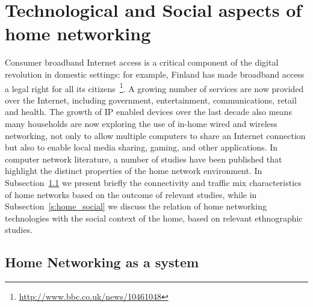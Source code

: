 

\section{Technological and Social aspects of home networking} \label{s:elephant}

Consumer broadband Internet access is a critical component of the digital
revolution in domestic settings: for example, Finland has made broadband access
a legal right for all its
citizens~\footnote{\url{http://www.bbc.co.uk/news/10461048}}. A growing number
of services are now provided over the Internet, including government,
entertainment, communications, retail and health.  The growth of IP enabled
devices over the last decade also means many households are now exploring the
use of in-home wired and wireless networking, not only to allow multiple
computers to share an Internet connection but also to enable local media
sharing, gaming, and other applications.  In computer network literature, a
number of studies have been published that highlight the distinct properties of
the home network environment. In Subsection~\ref{s:home_measurement} we present
briefly the connectivity and traffic mix characteristics of home networks
based on the outcome of relevant studies, while in Subsection~\ref{s:home_social}
we discuss the relation of home networking technologies with the social context 
of the home, based on relevant ethnographic studies. 



\subsection{Home Networking as a system} \label{s:home_measurement}

